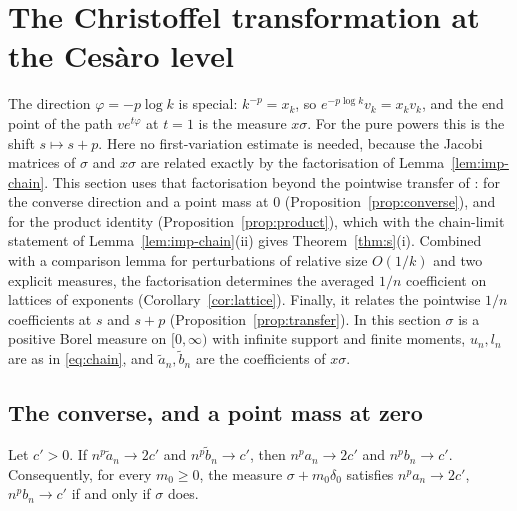 \section{The Christoffel transformation at the Ces\`aro level}\label{sec:christoffel}

The direction $\varphi=-p\log k$ is special: $k^{-p}=x_k$, so $e^{-p\log k}v_k=x_kv_k$, and the end point of the path
$ve^{t\varphi}$ at $t=1$ is the measure $x\sigma$. For the pure powers this is the shift $s\mapsto s+p$. Here no
first-variation estimate is needed, because the Jacobi matrices of $\sigma$ and $x\sigma$ are related exactly by the
factorisation of Lemma~\ref{lem:imp-chain}. This section uses that factorisation beyond the pointwise transfer of
\cite{PaperII}: for the converse direction and a point mass at $0$ (Proposition~\ref{prop:converse}), and for the
product identity (Proposition~\ref{prop:product}), which with the chain-limit statement of
Lemma~\ref{lem:imp-chain}(ii) gives Theorem~\ref{thm:s}(i). Combined with a comparison lemma for perturbations of
relative size $O(1/k)$ and two explicit measures, the factorisation determines the averaged $1/n$ coefficient on
lattices of exponents (Corollary~\ref{cor:lattice}). Finally, it relates the pointwise $1/n$ coefficients at $s$ and $s+p$
(Proposition~\ref{prop:transfer}). In this section $\sigma$ is a positive Borel measure on $[0,\infty)$ with infinite
support and finite moments, $u_n,l_n$ are as in \eqref{eq:chain}, and $\tilde a_n,\tilde b_n$ are the coefficients of
$x\sigma$.

\subsection{The converse, and a point mass at zero}

\begin{proposition}\label{prop:converse}
Let $c'>0$. If $n^p\tilde a_n\to2c'$ and $n^p\tilde b_n\to c'$, then $n^pa_n\to2c'$ and $n^pb_n\to c'$. Consequently,
for every $m_0\ge0$, the measure $\sigma+m_0\delta_0$ satisfies $n^pa_n\to2c'$, $n^pb_n\to c'$ if and only if $\sigma$
does.
\end{proposition}

